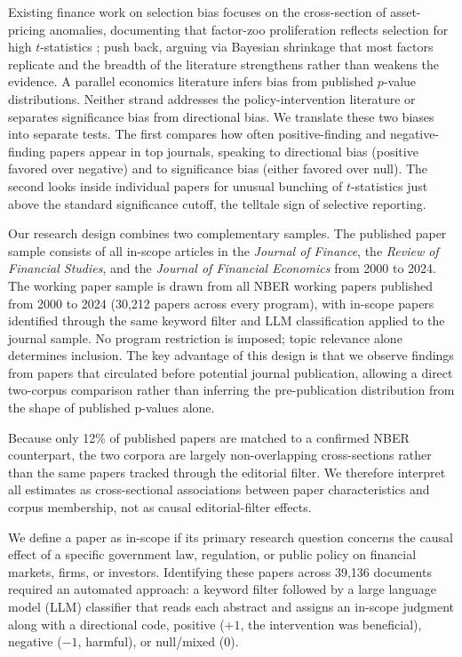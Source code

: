\documentclass[12pt]{article}
\newcommand{\JF}{\textit{Journal of Finance}}
\newcommand{\RFS}{\textit{Review of Financial Studies}}
\newcommand{\JFE}{\textit{Journal of Financial Economics}}
\begin{document}
Existing finance work on selection bias focuses on the cross-section
of asset-pricing anomalies, documenting that factor-zoo proliferation
reflects selection for high $t$-statistics
\citep*{Harvey2016,Hou2020}; \citet*{Jensen2023} push back, arguing via
Bayesian shrinkage that most factors replicate and the breadth of the
literature strengthens rather than weakens the evidence.  A parallel
economics literature \citep*{Brodeur2016,Andrews2019} infers bias from
published $p$-value distributions.  Neither strand addresses the
policy-intervention literature or separates significance bias from
directional bias.  We translate these two biases into separate
tests.  The first compares how often positive-finding and
negative-finding papers appear in top journals, speaking to
directional bias (positive favored over negative) and to significance
bias (either favored over null).  The second looks inside individual
papers for unusual bunching of $t$-statistics just above the standard
significance cutoff, the telltale sign of selective reporting.

Our research design combines two complementary samples.  The
published paper sample consists of all in-scope articles in the \JF{},
the \RFS{}, and the \JFE{} from 2000 to 2024.  The working paper
sample is drawn from all NBER working papers published from 2000 to 2024
(30,212 papers across every program), with in-scope papers identified through
the same keyword filter and LLM classification applied to the journal sample.
No program restriction is imposed; topic relevance alone determines inclusion.
The key advantage of this design is that we observe findings from
papers that circulated before potential journal publication, allowing a
direct two-corpus comparison rather than inferring the pre-publication
distribution from the shape of published p-values alone.

Because only 12\% of published papers are matched to a confirmed NBER counterpart, the two corpora are largely non-overlapping cross-sections rather than the same papers tracked through the editorial filter.  We therefore interpret all estimates as cross-sectional associations between paper characteristics and corpus membership, not as causal editorial-filter effects.

We define a paper as in-scope if its primary research question concerns the
causal effect of a specific government law, regulation, or public policy on
financial markets, firms, or investors.  Identifying these papers across
39,136 documents required an automated approach: a keyword filter
followed by a large language model (LLM) classifier that reads each abstract
and assigns an in-scope judgment along with a directional code, positive
($+1$, the intervention was beneficial), negative ($-1$, harmful), or
null/mixed ($0$).
\end{document}
